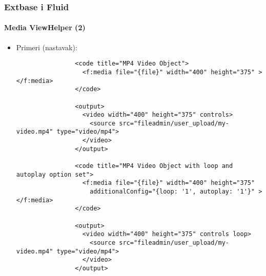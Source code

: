 
\begin{frame}[fragile]
	\frametitle{Extbase i Fluid}
	\framesubtitle{Media ViewHelper (2)}

	\lstset{basicstyle=\tiny\ttfamily}

	\begin{itemize}

		\item Primeri (nastavak):

			\begin{lstlisting}
				<code title="MP4 Video Object">
				  <f:media file="{file}" width="400" height="375" ></f:media>
				</code>

				<output>
				  <video width="400" height="375" controls>
				    <source src="fileadmin/user_upload/my-video.mp4" type="video/mp4">
				  </video>
				</output>

				<code title="MP4 Video Object with loop and autoplay option set">
				  <f:media file="{file}" width="400" height="375"
				    additionalConfig="{loop: '1', autoplay: '1'}" ></f:media>
				</code>

				<output>
				  <video width="400" height="375" controls loop>
				    <source src="fileadmin/user_upload/my-video.mp4" type="video/mp4">
				  </video>
				</output>
			\end{lstlisting}

	\end{itemize}

\end{frame}


